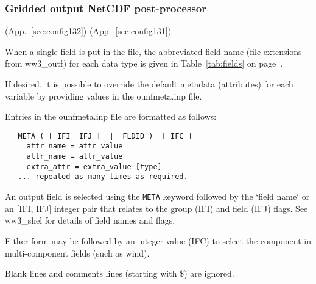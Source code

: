 \vsssub
\subsubsection{Gridded output NetCDF post-processor} \label{sec:ww3ounf}
\vsssub

 (App.~\ref{sec:config132})
 (App.~\ref{sec:config131})


\vspace{\baselineskip} 

\noindent
When a single field is put in the file, the abbreviated field name (file
extensions from ww3\_outf) for each data type is given in
Table~\ref{tab:fields} on page~\pageref{tab:fields}.

\noindent
If desired, it is possible to override the default metadata (attributes)
for each variable by providing values in the ounfmeta.inp file.

\noindent
Entries in the ounfmeta.inp file are formatted as follows:
\begin{verbatim}
   META ( [ IFI  IFJ ]  |  FLDID )  [ IFC ]
     attr_name = attr_value
     attr_name = attr_value
     extra_attr = extra_value [type]
   ... repeated as many times as required.
\end{verbatim}

\noindent
An output field is selected using the \texttt{META} keyword followed by
the `field name` or an [IFI, IFJ] integer pair that relates to the
group (IFI) and field (IFJ) flags. See ww3\_shel for details of
field names and flags.

\noindent
Either form may be followed by an integer value (IFC) to select the 
component in multi-component fields (such as wind).

\noindent
Blank lines and comments lines (starting with \$) are ignored.

